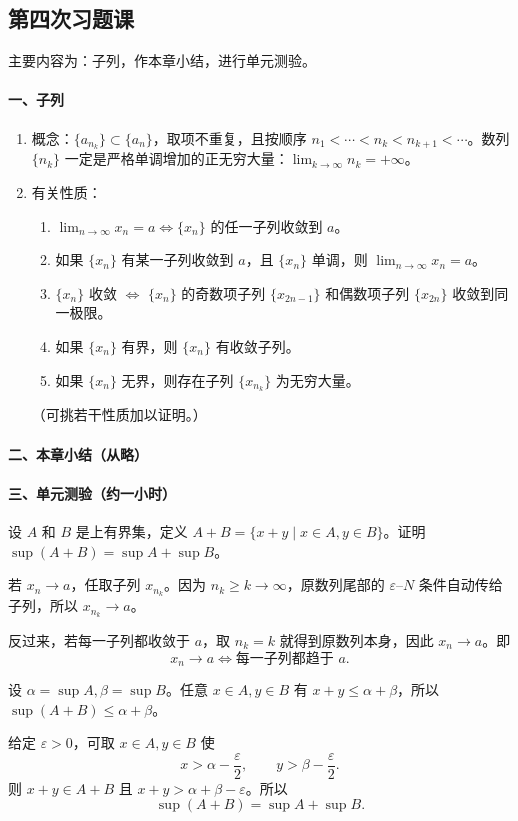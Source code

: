 \subsection{第四次习题课}

主要内容为：子列，作本章小结，进行单元测验。

\paragraph{一、子列}

\begin{enumerate}[label=\arabic*.]
  \item 概念：$\{a_{n_k}\}\subset\{a_n\}$，取项不重复，且按顺序 $n_1<\cdots<n_k<n_{k+1}<\cdots$。数列 $\{n_k\}$ 一定是严格单调增加的正无穷大量：$\displaystyle\lim_{k\to\infty}n_k=+\infty$。
  \item 有关性质：
  \begin{enumerate}[label=(\arabic*)]
    \item $\displaystyle\lim_{n\to\infty}x_n=a\Longleftrightarrow\{x_n\}$ 的任一子列收敛到 $a$。
    \item 如果 $\{x_n\}$ 有某一子列收敛到 $a$，且 $\{x_n\}$ 单调，则 $\displaystyle\lim_{n\to\infty}x_n=a$。
    \item $\{x_n\}$ 收敛 $\Longleftrightarrow$ $\{x_n\}$ 的奇数项子列 $\{x_{2n-1}\}$ 和偶数项子列 $\{x_{2n}\}$ 收敛到同一极限。
    \item 如果 $\{x_n\}$ 有界，则 $\{x_n\}$ 有收敛子列。
    \item 如果 $\{x_n\}$ 无界，则存在子列 $\{x_{n_k}\}$ 为无穷大量。
  \end{enumerate}
  （可挑若干性质加以证明。）
\end{enumerate}

\paragraph{二、本章小结（从略）}

\paragraph{三、单元测验（约一小时）}

\begin{xexercise}[1]
设 $A$ 和 $B$ 是上有界集，定义 $A+B=\{x+y\mid x\in A,y\in B\}$。证明 $\sup(A+B)=\sup A+\sup B$。
\end{xexercise}
\begin{xsolution}
若 $x_n\to a$，任取子列 $x_{n_k}$。因为 $n_k\ge k\to\infty$，原数列尾部的 $\varepsilon$--$N$ 条件自动传给子列，所以 $x_{n_k}\to a$。

反过来，若每一子列都收敛于 $a$，取 $n_k=k$ 就得到原数列本身，因此 $x_n\to a$。即
\[
  \boxed{x_n\to a\Longleftrightarrow\text{每一子列都趋于 }a}.
\]

设 $\alpha=\sup A,\beta=\sup B$。任意 $x\in A,y\in B$ 有 $x+y\le\alpha+\beta$，所以 $\sup(A+B)\le\alpha+\beta$。

给定 $\varepsilon>0$，可取 $x\in A,y\in B$ 使
\[
  x>\alpha-\frac\varepsilon2,
  \qquad y>\beta-\frac\varepsilon2.
\]
则 $x+y\in A+B$ 且 $x+y>\alpha+\beta-\varepsilon$。所以
\[
  \boxed{\sup(A+B)=\sup A+\sup B}.
\]
\end{xsolution}


